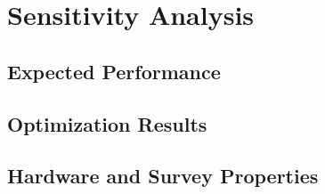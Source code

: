 \chapter{Sensitivity Analysis}

\section{Expected Performance}

\section{Optimization Results}

\section{Hardware and Survey Properties}
